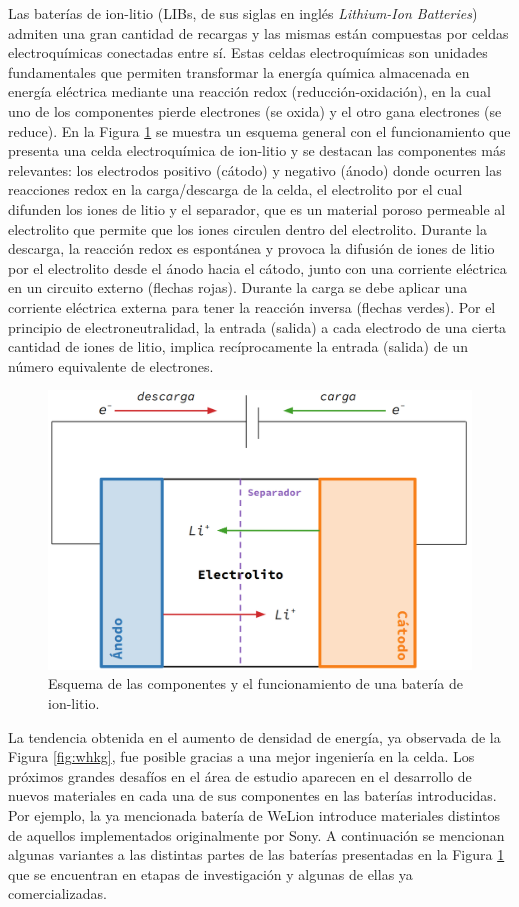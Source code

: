 Las baterías de ion-litio (LIBs, de sus siglas en inglés \textit{Lithium-Ion 
Batteries}) admiten una gran cantidad de recargas y las mismas están compuestas 
por celdas electroquímicas conectadas entre sí. Estas celdas electroquímicas son unidades 
fundamentales que permiten transformar la energía química almacenada en energía
eléctrica mediante una reacción redox (reducción-oxidación), en la cual uno de los 
componentes pierde electrones (se oxida) y el otro gana electrones (se reduce).
En la Figura \ref{fig:esquema-bateria} se muestra un esquema general con el 
funcionamiento que presenta una celda electroquímica de ion-litio y se destacan 
las componentes más relevantes: los electrodos positivo (cátodo) y negativo (ánodo) 
donde ocurren las reacciones redox en la carga/descarga de la celda, el electrolito 
por el cual difunden los iones de litio y el separador, que es un material 
poroso permeable al electrolito que permite que los iones circulen dentro del electrolito.
Durante la descarga, la reacción redox es espontánea y 
provoca la difusión de iones de litio por el electrolito desde el ánodo hacia el 
cátodo, junto con una corriente eléctrica en un circuito externo (flechas rojas). 
Durante la carga se debe aplicar una corriente eléctrica externa para tener la 
reacción inversa (flechas verdes).
Por el principio de electroneutralidad, la entrada (salida) a cada electrodo de una cierta cantidad de iones de litio, implica recíprocamente la entrada (salida) de un número equivalente de electrones.
\begin{figure}[h!]
    \centering
    \includegraphics[width=.8\textwidth]{Introduccion/baterias/esquema_bateria.png}
    \caption{Esquema de las componentes y el funcionamiento de una batería de 
    ion-litio.}
    \label{fig:esquema-bateria}
\end{figure}

La tendencia obtenida en el aumento de densidad de energía, ya observada de la 
Figura \ref{fig:whkg}, fue posible gracias a una mejor ingeniería en la celda. 
Los próximos grandes desafíos en el área de estudio aparecen en el desarrollo de 
nuevos materiales en cada una de sus componentes en las baterías introducidas.
Por ejemplo, la ya mencionada batería de WeLion introduce materiales distintos 
de aquellos implementados originalmente por Sony. A continuación se mencionan
algunas variantes a las distintas partes de las baterías presentadas en la
Figura \ref{fig:esquema-bateria} que se encuentran en etapas de investigación 
y algunas de ellas ya comercializadas.

